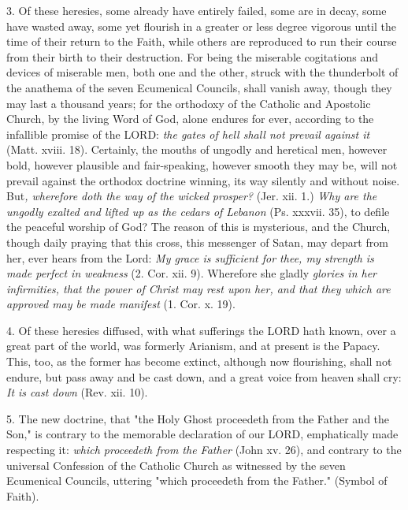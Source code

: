 3. Of these heresies, some already have entirely failed, some are in
decay, some have wasted away, some yet flourish in a greater or less
degree vigorous until the time of their return to the Faith, while
others are reproduced to run their course from their birth to their
destruction. For being the miserable cogitations and devices of
miserable men, both one and the other, struck with the thunderbolt of
the anathema of the seven Ecumenical Councils, shall vanish away, though
they may last a thousand years; for the orthodoxy of the Catholic and
Apostolic Church, by the living Word of God, alone endures for ever,
according to the infallible promise of the LORD: \emph{the gates of hell
shall not prevail against it} (Matt. xviii. 18). Certainly, the mouths
of ungodly and heretical men, however bold, however plausible and
fair-speaking, however smooth they may be, will not prevail against the
orthodox doctrine winning, its way silently and without noise.
But\emph{, wherefore doth the way of the wicked prosper?} (Jer. xii. 1.)
\emph{Why are the ungodly exalted and lifted up as the cedars of
Lebanon} (Ps. xxxvii. 35), to defile the peaceful worship of God? The
reason of this is mysterious, and the Church, though daily praying that
this cross, this messenger of Satan, may depart from her, ever hears
from the Lord: \emph{My grace is sufficient for thee, my strength is
made perfect in weakness} (2. Cor. xii. 9). Wherefore she gladly
\emph{glories in her infirmities, that the power of Christ may rest upon
her, and that they which are approved may be made manifest} (1. Cor. x.
19).

4. Of these heresies diffused, with what sufferings the LORD hath known,
over a great part of the world, was formerly Arianism, and at present is
the Papacy. This, too, as the former has become extinct, although now
flourishing, shall not endure, but pass away and be cast down, and a
great voice from heaven shall cry: \emph{It is cast down} (Rev. xii.
10).

5. The new doctrine, that "the Holy Ghost proceedeth from the Father and
the Son," is contrary to the memorable declaration of our LORD,
emphatically made respecting it: \emph{which proceedeth from the Father}
(John xv. 26), and contrary to the universal Confession of the Catholic
Church as witnessed by the seven Ecumenical Councils, uttering "which
proceedeth from the Father." (Symbol of Faith).

